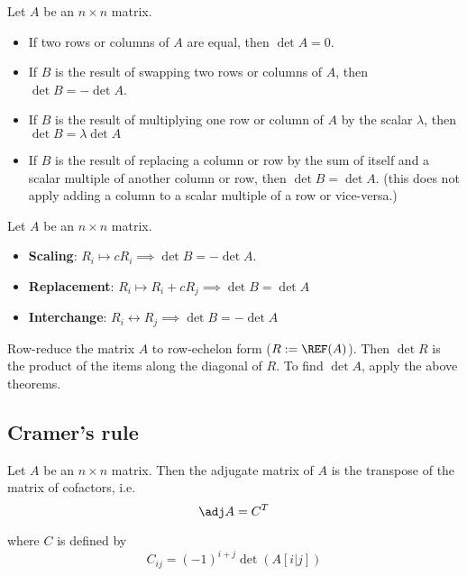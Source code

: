 \begin{theorem}
  Let $A$ be an $n \times n$ matrix.
  \begin{itemize}
    \item If two rows or columns of $A$ are equal, then $\det A = 0$.
    \item If $B$ is the result of swapping two rows or columns of $A$, then $\det B = - \det A$.
    \item If $B$ is the result of multiplying one row or column of $A$ by the scalar $\lambda$, then $\det B = \lambda \det A$
    \item If $B$ is the result of replacing a column or row by the sum of itself and a scalar multiple of another column or row, then $\det B = \det A$. (this does not apply adding a column to a scalar multiple of a row or vice-versa.)
  \end{itemize}
\end{theorem}

\begin{theorem}
  Let $A$ be an $n \times n$ matrix.
  \begin{itemize}
    \item \textbf{Scaling}: $R_i \mapsto cR_i \implies \det B = - \det A$.
    \item \textbf{Replacement}: $R_i \mapsto R_i + cR_j \implies \det B = \det A$
    \item \textbf{Interchange}: $R_i \leftrightarrow R_j \implies \det B = - \det A$
  \end{itemize}
\end{theorem}

\begin{procedure}
  Row-reduce the matrix $A$ to row-echelon form ($R := \REF(A)$). Then $\det R$ is the product of the items along the diagonal of $R$. To find $\det A$, apply the above theorems.
\end{procedure}

\subsection{Cramer's rule}

\begin{definition}
  Let $A$ be an $n \times n$ matrix. Then the adjugate matrix of $A$ is the transpose of the matrix of cofactors, i.e.
  \[
    \adj A = C^T
  \]

  where $C$ is defined by
  \[
    C_{ij} = (-1)^{i + j} \det(A[i|j])
  \]
\end{definition}

